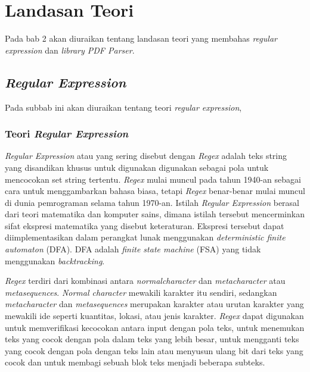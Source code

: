 \chapter{Landasan Teori}
\label{chap:teori}

Pada bab 2 akan diuraikan tentang landasan teori yang membahas \textit{regular expression} dan \textit{library PDF Parser}.

\section{\textit{Regular Expression}}
\label{sec:regex} 
 
Pada subbab ini akan diuraikan tentang teori \textit{regular expression},

\subsection{Teori \textit{Regular Expression}}

\textit{Regular Expression} atau yang sering disebut dengan \textit{Regex} adalah teks string yang disandikan khusus untuk digunakan digunakan sebagai pola untuk mencocokan set string tertentu. \textit{Regex} mulai muncul pada tahun 1940-an sebagai cara untuk menggambarkan bahasa biasa, tetapi \textit{Regex} benar-benar mulai muncul di dunia pemrograman selama tahun 1970-an. Istilah \textit{Regular Expression} berasal dari teori matematika dan komputer sains, dimana istilah tersebut mencerminkan sifat ekspresi matematika yang disebut keteraturan. Ekspresi tersebut dapat diimplementasikan dalam perangkat lunak menggunakan \textit{deterministic finite automaton} (DFA). DFA adalah \textit{finite state machine} (FSA) yang tidak menggunakan \textit{backtracking}.

\textit{Regex} terdiri dari kombinasi antara \textit{normalcharacter} dan \textit{metacharacter} atau \textit{metasequences}. \textit{Normal character} mewakili karakter itu sendiri, sedangkan \textit{metacharacter} dan \textit{metasequences} merupakan karakter atau urutan karakter yang mewakili ide seperti kuantitas, lokasi, atau jenis karakter. \textit{Regex} dapat digunakan untuk memverifikasi kecocokan antara input dengan pola teks, untuk menemukan teks yang cocok dengan pola dalam teks yang lebih besar, untuk mengganti teks yang cocok dengan pola dengan teks lain atau menyusun ulang bit dari teks yang cocok dan untuk membagi sebuah blok teks menjadi beberapa subteks. \\

